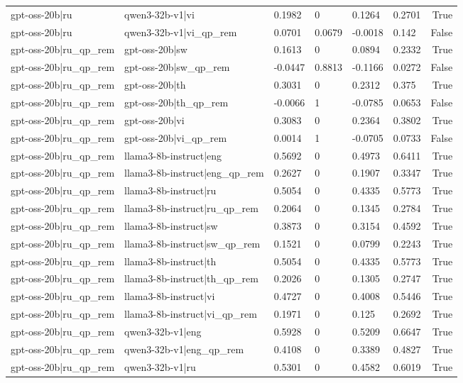 \begin{table}
\begin{tabular}{llllllr}
gpt-oss-20b|ru & qwen3-32b-v1|vi & 0.1982 & 0 & 0.1264 & 0.2701 & True \\
gpt-oss-20b|ru & qwen3-32b-v1|vi_qp_rem & 0.0701 & 0.0679 & -0.0018 & 0.142 & False \\
gpt-oss-20b|ru_qp_rem & gpt-oss-20b|sw & 0.1613 & 0 & 0.0894 & 0.2332 & True \\
gpt-oss-20b|ru_qp_rem & gpt-oss-20b|sw_qp_rem & -0.0447 & 0.8813 & -0.1166 & 0.0272 & False \\
gpt-oss-20b|ru_qp_rem & gpt-oss-20b|th & 0.3031 & 0 & 0.2312 & 0.375 & True \\
gpt-oss-20b|ru_qp_rem & gpt-oss-20b|th_qp_rem & -0.0066 & 1 & -0.0785 & 0.0653 & False \\
gpt-oss-20b|ru_qp_rem & gpt-oss-20b|vi & 0.3083 & 0 & 0.2364 & 0.3802 & True \\
gpt-oss-20b|ru_qp_rem & gpt-oss-20b|vi_qp_rem & 0.0014 & 1 & -0.0705 & 0.0733 & False \\
gpt-oss-20b|ru_qp_rem & llama3-8b-instruct|eng & 0.5692 & 0 & 0.4973 & 0.6411 & True \\
gpt-oss-20b|ru_qp_rem & llama3-8b-instruct|eng_qp_rem & 0.2627 & 0 & 0.1907 & 0.3347 & True \\
gpt-oss-20b|ru_qp_rem & llama3-8b-instruct|ru & 0.5054 & 0 & 0.4335 & 0.5773 & True \\
gpt-oss-20b|ru_qp_rem & llama3-8b-instruct|ru_qp_rem & 0.2064 & 0 & 0.1345 & 0.2784 & True \\
gpt-oss-20b|ru_qp_rem & llama3-8b-instruct|sw & 0.3873 & 0 & 0.3154 & 0.4592 & True \\
gpt-oss-20b|ru_qp_rem & llama3-8b-instruct|sw_qp_rem & 0.1521 & 0 & 0.0799 & 0.2243 & True \\
gpt-oss-20b|ru_qp_rem & llama3-8b-instruct|th & 0.5054 & 0 & 0.4335 & 0.5773 & True \\
gpt-oss-20b|ru_qp_rem & llama3-8b-instruct|th_qp_rem & 0.2026 & 0 & 0.1305 & 0.2747 & True \\
gpt-oss-20b|ru_qp_rem & llama3-8b-instruct|vi & 0.4727 & 0 & 0.4008 & 0.5446 & True \\
gpt-oss-20b|ru_qp_rem & llama3-8b-instruct|vi_qp_rem & 0.1971 & 0 & 0.125 & 0.2692 & True \\
gpt-oss-20b|ru_qp_rem & qwen3-32b-v1|eng & 0.5928 & 0 & 0.5209 & 0.6647 & True \\
gpt-oss-20b|ru_qp_rem & qwen3-32b-v1|eng_qp_rem & 0.4108 & 0 & 0.3389 & 0.4827 & True \\
gpt-oss-20b|ru_qp_rem & qwen3-32b-v1|ru & 0.5301 & 0 & 0.4582 & 0.6019 & True \\

\end{tabular}
\end{table}
